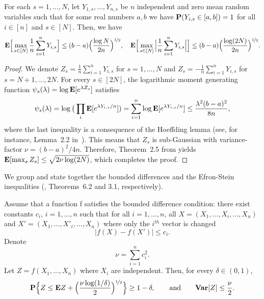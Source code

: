 \begin{theorem}\label{Hoeffding1}
	For each $s=1,\ldots,N$, let $Y_{1,s},\ldots,Y_{n,s}$ be $n$ independent and zero mean random variables such that
	for some real numbers $a,b$ we have $\mathbf P(Y_{i,s}\in[a,b])=1$ for all $i\in[n]$
	and $s\in[N]$. Then, we have
	\begin{equation}
	\mathbf E\Big[\max_{s\in[N]} \frac1n\sum_{i=1}^n Y_{i,s}\Big]\le (b-a)\Big(\frac{\log N}{2n}\Big)^{\nicefrac12},\quad
	\mathbf E\Big[\max_{s\in[N]}\Big| \frac1n\sum_{i=1}^n Y_{i,s}\Big|\Big]\le (b-a)\Big(\frac{\log(2N)}{2n}\Big)^{\nicefrac12}.
	\end{equation}
\end{theorem}
\begin{proof}
	We denote $Z_s = \frac1n\sum_{i=1}^n Y_{i,s}$ for $s=1,\ldots, N$ and $Z_s = -\frac1n\sum_{i=1}^n Y_{i,s}$
	for $s=N+1,\ldots,2N$. For every $s\in[2N]$, the logarithmic moment generating function $\psi_s(\lambda) =
	\log \mathbf E[e^{\lambda Z_{s}}]$ satisfies
	\begin{equation}
	\psi_s(\lambda) =  \log \big(\prod_i \mathbf E[e^{\lambda Y_{i,s}/n}])
	= \sum_{i=1}^n \log  \mathbf E[e^{\lambda Y_{i,s}/n}] \le \frac{\lambda^2(b-a)^2}{8n},
	\end{equation}
	where the last inequality is a consequence of the Hoeffding lemma (see, for instance,  Lemma~2.2
	in~\citep{boucheron2013concentration}). This means that $Z_s$ is sub-Gaussian with variance-factor
	$\nu = {(b-a)^2}/{4n}$. Therefore, Theorem~2.5 from \citep{boucheron2013concentration}
	yields $\mathbf E[\max_s Z_s]\le \sqrt{2\nu\log(2N)}$, which completes the proof.
\end{proof}

We group and state together the bounded differences and the Efron-Stein inequalities (\cite{boucheron2013concentration},
Theorems~6.2 and 3.1, respectively).

\begin{theorem}\label{McDiarmid}
	Assume that a function f satisfies the bounded difference condition: there exist constants $c_i$, $i=1,\ldots,n$
	such that for all $i=1,\ldots, n$, all $X=(X_1,\dots,X_i,\dots,X_n)$ and $X'=(X_1,\dots,X'_i,\dots,X_n)$ where
	only the $i^{th}$ vector is changed
	\begin{equation}
	|f(X)-f(X')| \leq c_i.
	\end{equation}
	Denote
	\begin{equation}
	\nu = \sum_{i=1}^n c_i^2.
	\end{equation}
	Let $Z=f(X_1,\dots,X_n)$ where $X_i$ are independent. Then, for every $\delta\in(0,1)$,
	\begin{equation}
	\mathbf P\Big\{Z\le \mathbf E Z +\Big(\frac{\nu\log(1/\delta)}{2}\Big)^{\nicefrac12} \Big\} \geq 1-\delta,\qquad\text{and}\qquad {\bf Var}[Z] \le \frac{\nu}{2}.
	\end{equation}
\end{theorem}

